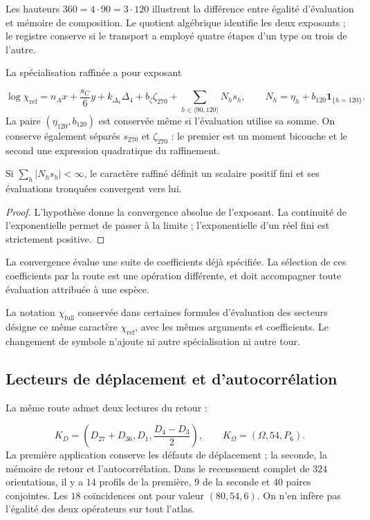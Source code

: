 Les hauteurs \(360=4\cdot90=3\cdot120\) illustrent la différence entre
égalité d’évaluation et mémoire de composition. Le quotient algébrique
identifie les deux exposants ; le registre conserve si le transport
a employé quatre étapes d’un type ou trois de l’autre.


La spécialisation raffinée a pour exposant

\[
 \log\chi_{\mathrm{ref}}=n_Ax+\frac{s_C}{6}y+k_{\Delta_4}\Delta_4
 +b_{\zeta}\zeta_{270}+\sum_{h\in\langle90,120\rangle}N_hs_h,
 \qquad N_h=\eta_h+b_{120}\mathbf1_{\{h=120\}}.
\]
La paire \((\eta_{120},b_{120})\) est conservée même si l’évaluation utilise
sa somme. On conserve également séparés \(s_{270}\) et
\(\zeta_{270}\) : le premier est un moment bicouche et le second une
expression quadratique du raffinement.


\begin{proposition}
Si \(\sum_h|N_hs_h|<\infty\), le caractère raffiné définit un scalaire
positif fini et ses évaluations tronquées convergent vers lui.

\end{proposition}
\begin{proof}
L’hypothèse donne la convergence absolue de l’exposant. La continuité de
l’exponentielle permet de passer à la limite ; l’exponentielle d’un réel fini est
strictement positive.

\end{proof}

La convergence évalue une suite de coefficients déjà spécifiée.
La sélection de ces coefficients par la route est une opération différente,
et doit accompagner toute évaluation attribuée à une espèce.


La notation \(\chi_{\mathrm{full}}\) conservée dans certaines formules
d’évaluation des secteurs désigne ce même caractère
\(\chi_{\mathrm{ref}}\), avec les mêmes arguments et coefficients.
Le changement de symbole n’ajoute ni autre spécialisation ni autre tour.


\subsection{Lecteurs de déplacement et d’autocorrélation
}

La même route admet deux lectures du retour :

\[
 K_D=\left(D_{27}+D_{36},D_1,\frac{D_4-D_3}{2}\right),\qquad
 K_\Omega=(\Omega,54,P_6).
\]
La première application conserve les défauts de déplacement ; la seconde, la mémoire de
retour et l’autocorrélation. Dans le recensement complet de \(324\) orientations,
il y a \(14\) profils de la première, \(9\) de la seconde et \(40\) paires
conjointes. Les \(18\) coïncidences ont pour valeur \((80,54,6)\).
On n’en infère pas l’égalité des deux opérateurs sur tout l’atlas.


